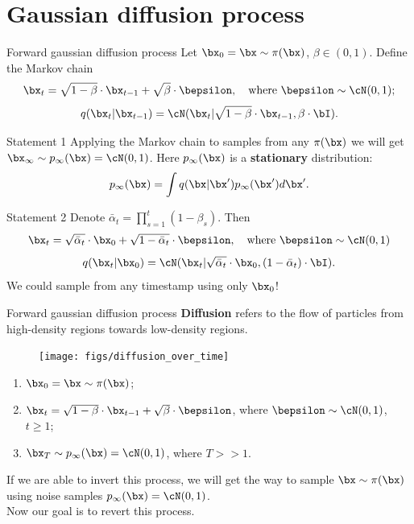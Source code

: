 \section{Gaussian diffusion process}
\begin{frame}{Forward gaussian diffusion process}
	Let $\bx_0 = \bx \sim \pi(\bx)$, $\beta \in (0, 1)$. Define the Markov chain
	\[
		\bx_t = \sqrt{1 - \beta} \cdot \bx_{t - 1} + \sqrt{\beta} \cdot \bepsilon, \quad \text{where }\bepsilon \sim \cN(0, 1);
	\]
	\[
		q(\bx_t | \bx_{t-1}) = \cN(\bx_t | \sqrt{1 - \beta} \cdot \bx_{t-1}, \beta \cdot \bI).
	\]
	\vspace{-0.6cm}
	\begin{block}{Statement 1}
		Applying the Markov chain to samples from any $\pi(\bx)$ we will get $\bx_{\infty} \sim p_{\infty}(\bx) = \cN(0, 1)$. Here $p_{\infty}(\bx)$ is a \textbf{stationary} distribution:
		\vspace{-0.2cm}
		\[
			p_{\infty}(\bx) = \int q(\bx | \bx') p_{\infty}(\bx') d \bx'. 
		\]
		\vspace{-0.8cm}
	\end{block}
	\begin{block}{Statement 2}
		Denote $\bar{\alpha}_t = \prod_{s=1}^t (1 - \beta_s)$. Then 
		\vspace{-0.2cm}
		\[
			\bx_t = \sqrt{\bar{\alpha}_t} \cdot \bx_{0} + \sqrt{1 - \bar{\alpha}_t} \cdot \bepsilon, \quad \text{where } \bepsilon \sim \cN(0, 1)
		\]
		\vspace{-0.7cm}
		\[
			q(\bx_t | \bx_0) = \cN(\bx_t | \sqrt{\bar{\alpha}_t} \cdot \bx_0, (1 - \bar{\alpha}_t) \cdot \bI).
		\]
		We could sample from any timestamp using only $\bx_0$!
	\end{block}
\end{frame}
\begin{frame}{Forward gaussian diffusion process}
	\textbf{Diffusion} refers to the flow of particles from high-density regions towards low-density regions.
	\vspace{-0.2cm}
	\begin{figure}
		\texttt{[image: figs/diffusion\_over\_time]}
	\end{figure}
	\vspace{-0.6cm}
	\begin{enumerate}
		\item $\bx_0 = \bx \sim \pi(\bx)$;
		\item $\bx_t = \sqrt{1 - \beta} \cdot \bx_{t - 1} + \sqrt{\beta} \cdot \bepsilon$, where $\bepsilon \sim \cN(0, 1)$, $t \geq 1$;
		\item $\bx_T \sim p_{\infty}(\bx) = \cN(0, 1)$, where $T >> 1$.
	\end{enumerate}
	If we are able to invert this process, we will get the way to sample $\bx \sim \pi(\bx)$ using noise samples $p_{\infty}(\bx) = \cN(0, 1)$. \\ 
	Now our goal is to revert this process.
\end{frame}
